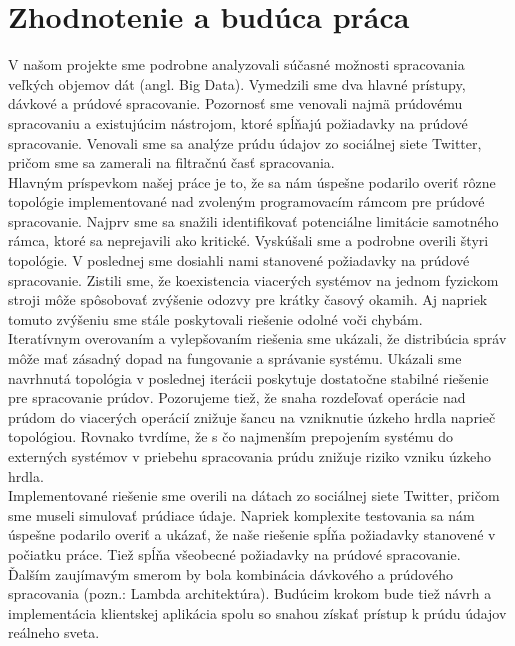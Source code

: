 %

\chapter{Zhodnotenie a budúca práca}
\label{conclusionandfuturework}
V našom projekte sme podrobne analyzovali súčasné možnosti spracovania veľkých objemov dát (angl. Big Data). Vymedzili sme dva hlavné prístupy, dávkové a prúdové spracovanie. Pozornosť sme venovali najmä prúdovému spracovaniu a existujúcim nástrojom, ktoré spĺňajú požiadavky na prúdové spracovanie. Venovali sme sa analýze prúdu údajov zo sociálnej siete Twitter, pričom sme sa zamerali na filtračnú časť spracovania.
\\[5pt]
Hlavným príspevkom našej práce je to, že sa nám úspešne podarilo overiť rôzne topológie implementované nad zvoleným programovacím rámcom pre prúdové spracovanie. Najprv sme sa snažili identifikovať potenciálne limitácie samotného rámca, ktoré sa neprejavili ako kritické. Vyskúšali sme a podrobne overili štyri topológie. V poslednej sme dosiahli nami stanovené požiadavky na prúdové spracovanie. Zistili sme, že koexistencia viacerých systémov na jednom fyzickom stroji môže spôsobovať zvýšenie odozvy pre krátky časový okamih. Aj napriek tomuto zvýšeniu sme stále poskytovali riešenie odolné voči chybám. 
\\[5pt]
Iteratívnym overovaním a vylepšovaním riešenia sme ukázali, že distribúcia správ môže mať zásadný dopad na fungovanie a správanie systému. Ukázali sme navrhnutá topológia v poslednej iterácii poskytuje dostatočne stabilné riešenie pre spracovanie prúdov. Pozorujeme tiež, že snaha rozdeľovať operácie nad prúdom do viacerých operácií znižuje šancu na vzniknutie úzkeho hrdla naprieč topológiou. Rovnako tvrdíme, že s čo najmenším prepojením systému do externých systémov v priebehu spracovania prúdu znižuje riziko vzniku úzkeho hrdla.
\\[5pt]
Implementované riešenie sme overili na dátach zo sociálnej siete Twitter, pričom sme museli simulovať prúdiace údaje. Napriek komplexite testovania sa nám úspešne podarilo overiť a ukázať, že naše riešenie spĺňa požiadavky stanovené v počiatku práce. Tiež spĺňa všeobecné požiadavky na prúdové spracovanie. 
\\[5pt]
Ďalším zaujímavým smerom by bola kombinácia dávkového a prúdového spracovania (pozn.: Lambda architektúra). Budúcim krokom bude tiež návrh a implementácia klientskej aplikácia spolu so snahou získať prístup k prúdu údajov reálneho sveta.
